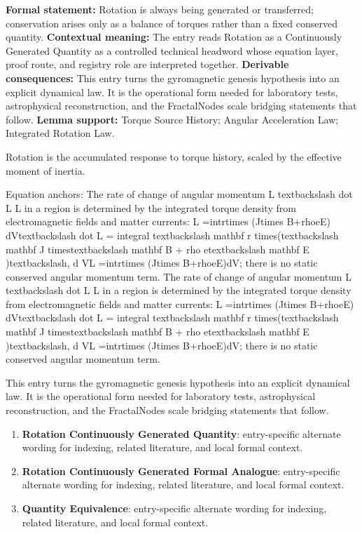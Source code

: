\begingroup\footnotesize\setlength{\emergencystretch}{3em}\sloppy
\textbf{Formal statement:} Rotation is always being generated or transferred; conservation arises only as a balance of torques rather than a fixed conserved quantity. \textbf{Contextual meaning:} The entry reads Rotation as a Continuously Generated Quantity as a controlled technical headword whose equation layer, proof route, and registry role are interpreted together. \textbf{Derivable consequences:} This entry turns the gyromagnetic genesis hypothesis into an explicit dynamical law. It is the operational form needed for laboratory tests, astrophysical reconstruction, and the FractalNodes scale bridging statements that follow. \textbf{Lemma support:} Torque Source History; Angular Acceleration Law; Integrated Rotation Law.\par
\endgroup

Rotation is the accumulated response to torque history, scaled by the effective moment of inertia.

Equation anchors: The rate of change of angular momentum L  textbackslash dot L L   in a region is determined by the integrated torque density from electromagnetic fields and matter currents: L  =intrtimes (Jtimes B+rhoeE) dVtextbackslash dot L = integral textbackslash mathbf r times(textbackslash mathbf J timestextbackslash mathbf B + rho etextbackslash mathbf E )textbackslash, d VL  =intrtimes (Jtimes B+rhoeE)dV; there is no static conserved angular momentum term. The rate of change of angular momentum L  textbackslash dot L L   in a region is determined by the integrated torque density from electromagnetic fields and matter currents: L  =intrtimes (Jtimes B+rhoeE) dVtextbackslash dot L = integral textbackslash mathbf r times(textbackslash mathbf J timestextbackslash mathbf B + rho etextbackslash mathbf E )textbackslash, d VL  =intrtimes (Jtimes B+rhoeE)dV; there is no static conserved angular momentum term.

This entry turns the gyromagnetic genesis hypothesis into an explicit dynamical law. It is the operational form needed for laboratory tests, astrophysical reconstruction, and the FractalNodes scale bridging statements that follow.
\endgroup

\begingroup\footnotesize\sloppy
\begin{enumerate}[leftmargin=1.35em,itemsep=1pt,topsep=1pt,parsep=0pt]
\item \textbf{Rotation Continuously Generated Quantity}: entry-specific alternate wording for indexing, related literature, and local formal context.
\item \textbf{Rotation Continuously Generated Formal Analogue}: entry-specific alternate wording for indexing, related literature, and local formal context.
\item \textbf{Quantity Equivalence}: entry-specific alternate wording for indexing, related literature, and local formal context.
\end{enumerate}
\endgroup

